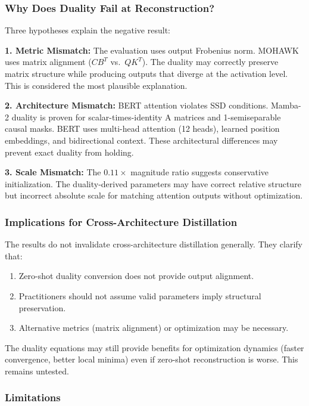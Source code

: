 
\subsubsection{Why Does Duality Fail at Reconstruction?}

Three hypotheses explain the negative result:

\textbf{1. Metric Mismatch:} The evaluation uses output Frobenius norm. MOHAWK uses matrix alignment ($CB^T$ vs.\ $QK^T$). The duality may correctly preserve matrix structure while producing outputs that diverge at the activation level. This is considered the most plausible explanation.

\textbf{2. Architecture Mismatch:} BERT attention violates SSD conditions. Mamba-2 duality is proven for scalar-times-identity A matrices and 1-semiseparable causal masks. BERT uses multi-head attention (12 heads), learned position embeddings, and bidirectional context. These architectural differences may prevent exact duality from holding.

\textbf{3. Scale Mismatch:} The 0.$11\times$ magnitude ratio suggests conservative initialization. The duality-derived parameters may have correct relative structure but incorrect absolute scale for matching attention outputs without optimization.

\subsubsection{Implications for Cross-Architecture Distillation}

The results do not invalidate cross-architecture distillation generally. They clarify that:

\begin{enumerate}
\item Zero-shot duality conversion does not provide output alignment.
\item Practitioners should not assume valid parameters imply structural preservation.
\item Alternative metrics (matrix alignment) or optimization may be necessary.
\end{enumerate}

The duality equations may still provide benefits for optimization dynamics (faster convergence, better local minima) even if zero-shot reconstruction is worse. This remains untested.

\subsubsection{Limitations}

